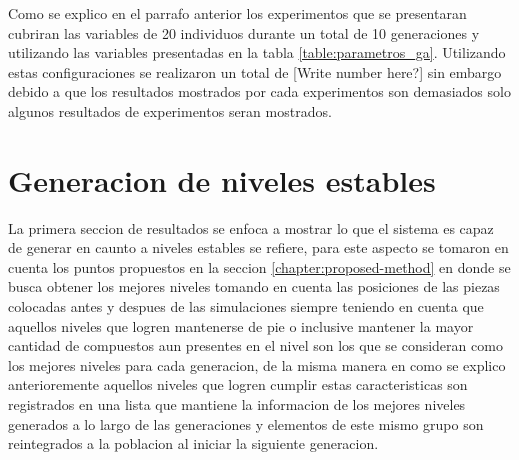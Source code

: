 Como se explico en el parrafo anterior los experimentos que se presentaran
cubriran las variables de 20 individuos durante un total de 10 generaciones y
utilizando las variables presentadas en la tabla \ref{table:parametros_ga}.
Utilizando estas configuraciones se realizaron un total de [Write number here?]
sin embargo debido a que los resultados mostrados por cada experimentos son
demasiados solo algunos resultados de experimentos seran mostrados.

\section{Generacion de niveles estables}
\label{section:chap6_stable_level_generation}

La primera seccion de resultados se enfoca a mostrar lo que el sistema es capaz
de generar en caunto a niveles estables se refiere, para este aspecto se tomaron
en cuenta los puntos propuestos en la seccion \ref{chapter:proposed-method} en
donde se busca obtener los mejores niveles tomando en cuenta las posiciones de
las piezas colocadas antes y despues de las simulaciones siempre teniendo en
cuenta que aquellos niveles que logren mantenerse de pie o inclusive mantener la
mayor cantidad de compuestos aun presentes en el nivel son los que se consideran
como los mejores niveles para cada generacion, de la misma manera en como se
explico anterioremente aquellos niveles que logren cumplir estas caracteristicas
son registrados en una lista que mantiene la informacion de los mejores niveles
generados a lo largo de las generaciones y elementos de este mismo grupo son
reintegrados a la poblacion al iniciar la siguiente generacion.

